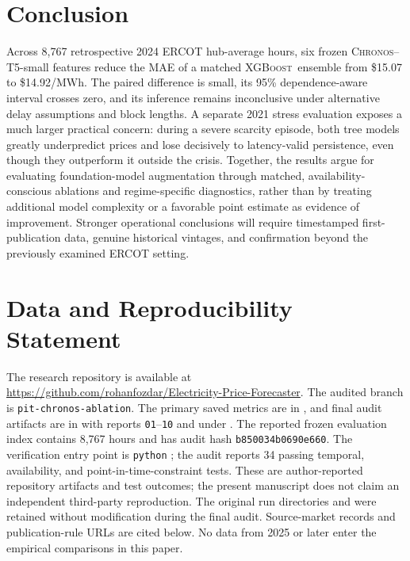 \documentclass[11pt,letterpaper]{article}
\newcommand{\MWh}{\ensuremath{\mathrm{MWh}}}
\newcommand{\Chronos}{\textsc{Chronos}}
\newcommand{\XGB}{\textsc{XGBoost}}
\begin{document}
\section{Conclusion}\label{sec:conclusion}
Across 8,767 retrospective 2024 ERCOT hub-average hours, six frozen \Chronos--T5-small features reduce the MAE of a matched \XGB\ ensemble from \$15.07 to \$14.92/\MWh. The paired difference is small, its 95\% dependence-aware interval crosses zero, and its inference remains inconclusive under alternative delay assumptions and block lengths. A separate 2021 stress evaluation exposes a much larger practical concern: during a severe scarcity episode, both tree models greatly underpredict prices and lose decisively to latency-valid persistence, even though they outperform it outside the crisis. Together, the results argue for evaluating foundation-model augmentation through matched, availability-conscious ablations and regime-specific diagnostics, rather than by treating additional model complexity or a favorable point estimate as evidence of improvement. Stronger operational conclusions will require timestamped first-publication data, genuine historical vintages, and confirmation beyond the previously examined ERCOT setting.

\section*{Data and Reproducibility Statement}
The research repository is available at \url{https://github.com/rohanfozdar/Electricity-Price-Forecaster}. The audited branch is \texttt{pit-chronos-ablation}. The primary saved metrics are in , and final audit artifacts are in  with reports \texttt{01}--\texttt{10} and  under . The reported frozen evaluation index contains 8,767 hours and has audit hash \texttt{b850034b0690e660}. The verification entry point is \texttt{python} ; the audit reports 34 passing temporal, availability, and point-in-time-constraint tests. These are author-reported repository artifacts and test outcomes; the present manuscript does not claim an independent third-party reproduction. The original run directories  and  were retained without modification during the final audit. Source-market records and publication-rule URLs are cited below. No data from 2025 or later enter the empirical comparisons in this paper.
\end{document}
